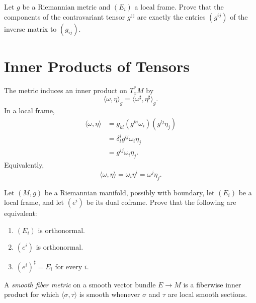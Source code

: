 \begin{exercise}
\label{exer:inverse-metric-ambiguity}
\leanok
{}
Let $g$ be a Riemannian metric and $(E_i)$ a local frame. Prove that the components
of the contravariant tensor $g^{\sharp\sharp}$ are exactly the entries $(g^{ij})$ of
the inverse matrix to $(g_{ij})$.
\end{exercise}

\section{Inner Products of Tensors}

The metric induces an inner product on $T_x^*M$ by
\[
\langle\omega,\eta\rangle_g
=\langle\omega^\sharp,\eta^\sharp\rangle_g.
\]
In a local frame,
\begin{align*}
\langle\omega,\eta\rangle
&=g_{kl}(g^{ki}\omega_i)(g^{lj}\eta_j)\\
&=\delta_l^i g^{lj}\omega_i\eta_j\\
&=g^{ij}\omega_i\eta_j.
\end{align*}
Equivalently,
\[
\langle\omega,\eta\rangle=\omega_i\eta^i=\omega^j\eta_j.
\]

\begin{exercise}
\label{exer:orthonormal-frames-and-coframes}
\leanok
{}
Let $(M,g)$ be a Riemannian manifold, possibly with boundary, let $(E_i)$ be a
local frame, and let $(e^i)$ be its dual coframe. Prove that the following are
equivalent:
\begin{enumerate}
\item[(a)] $(E_i)$ is orthonormal.
\item[(b)] $(e^i)$ is orthonormal.
\item[(c)] $(e^i)^\sharp=E_i$ for every $i$.
\end{enumerate}
\end{exercise}

A \emph{smooth fiber metric} on a smooth vector bundle $E\to M$ is a fiberwise
inner product for which $\langle\sigma,\tau\rangle$ is smooth whenever $\sigma$ and
$\tau$ are local smooth sections.

